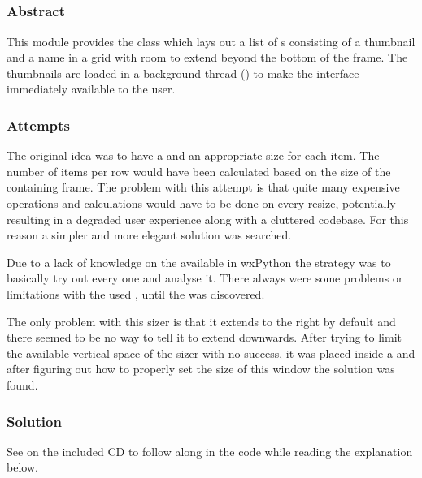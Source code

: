 \subsection{}
\label{subsec:mod:itemview}
\def\kapitelautor{Clemens Stadlbauer}

\subsubsection{Abstract}
This module provides the  class which lays out a list of
s consisting of a thumbnail and a name in a grid with room to
extend beyond the bottom of the frame. The thumbnails are loaded in a
background thread () to make the interface immediately
available to the user.

\subsubsection{Attempts}
The original idea was to have a  and an appropriate size for
each item. The number of items per row would have been calculated based on the
size of the containing frame. The problem with this attempt is that quite many
expensive operations and calculations would have to be done on every resize,
potentially resulting in a degraded user experience along with a cluttered
codebase. For this reason a simpler and more elegant solution was searched.

Due to a lack of knowledge on the available  in
wxPython the strategy was to basically try out every one and
analyse it. There always were some problems or limitations with the used
, until the  was discovered.

The only problem with this sizer is that it extends to the right by default
and there seemed to be no way to tell it to extend downwards. After trying
to limit the available vertical space of the sizer with no success, it was
placed inside a  and after figuring out how to properly
set the size of this window the solution was found.

\subsubsection{Solution} %

See  on the included CD to 
follow along in the code while reading the explanation below.

